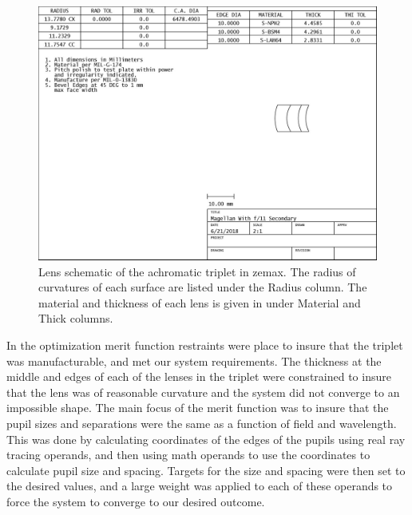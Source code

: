 \begin{figure}[h]
	\centering
	\includegraphics[width=.8\textwidth]{Chapter Materials/Chapter Three Materials/cameralenstripletSPEC.jpg}
	\caption{Lens schematic of the achromatic triplet in zemax. The radius of curvatures of each surface are listed under the Radius column. The material and thickness of each lens is given in under Material and Thick columns.  }
	\label{fig:triplet}
\end{figure}


In the optimization merit function restraints were place to insure that the triplet was manufacturable, and met our system requirements. The thickness at the middle and edges of each of the lenses in the triplet were constrained to insure that the lens was of reasonable curvature and the system did not converge to an impossible shape. The main focus of the merit function was to insure that the pupil sizes and separations were the same as a function of field and wavelength. This was done by calculating coordinates of the edges of the pupils using real ray tracing operands, and then using math operands to use the coordinates to calculate pupil size and spacing. Targets for the size and spacing were then set to the desired values, and a large weight was applied to each of these operands to force the system to converge to our desired outcome.


	
